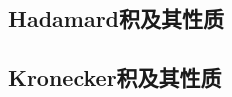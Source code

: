 \subsection{Hadamard积及其性质}
\label{sub:Hadamard积及其性质}

\begin{definition}
\end{definition}

\subsection{Kronecker积及其性质}
\label{sub:Kronecker积及其性质}


\begin{definition}
\end{definition}

\begin{definition}
\end{definition}

